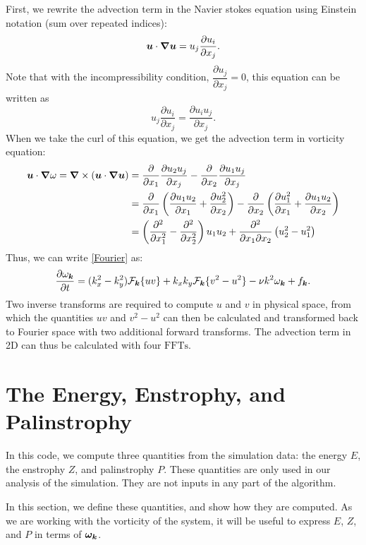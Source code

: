 \documentclass[12pt]{article}
\def\v{\bm}
\def\vw{{\v\w}}
\begin{document}
First, we rewrite the advection term in the Navier stokes equation using Einstein notation (sum over repeated indices):
$$\vu\cdot\grad\vu =u_j\dfrac{\partial u_i}{\partial x_j}.$$
Note that with the incompressibility condition, $\dfrac{\partial u_j}{\partial x_j} =0$, this equation can be written as 
\begin{equation}
u_j\dfrac{\partial u_i}{\partial x_j} = \dfrac{\partial u_iu_j}{\partial x_j}.
\end{equation}
When we take the curl of this equation, we get the advection term in vorticity equation:
\begin{align*}
\vu\cdot\grad\omega =\grad \times \left(\vu\cdot\grad\vu \right)&= \dfrac{\partial }{\partial x_1}\dfrac{\partial u_2u_j}{\partial x_j}  - \dfrac{\partial }{\partial x_2}\dfrac{\partial u_1u_j}{\partial x_j}\\
&= \dfrac{\partial }{\partial x_1}\left(\dfrac{\partial u_1u_2}{\partial x_1}+\dfrac{\partial u_2^2}{\partial x_2}\right)  - \dfrac{\partial }{\partial x_2}\left(\dfrac{\partial u_1^2}{\partial x_1}+\dfrac{\partial u_1u_2}{\partial x_2}\right)\\
&= \left(\frac{\partial^2}{\partial x_1^2} - \frac{\partial^2}{\partial x_2^2}\right)u_1u_2 +\frac{\partial^2}{\partial x_1\partial x_2}\left(u_2^2-u_1^2\right)\\
\end{align*}
Thus, we can write \ref{Fourier} as:
\begin{equation}\label{evolutionary}
  \frac{\partial\omega_{\vk}}{\partial t} =
  (k_x^2-k_y^2) {\cal F}_\vk\{uv\}+k_xk_y{\cal F}_\vk\{v^2-u^2\} -\nu k^2\omega_{\vk} + f_{\vk}.
\end{equation}
Two inverse transforms are required to compute $u$ and $v$ in physical
space, from which the quantities $uv$ and $v^2-u^2$ can then be
calculated and transformed back to Fourier space with two additional
forward transforms. The advection term in 2D can thus be calculated with four $\text{FFTs}$.
\section{The Energy, Enstrophy, and Palinstrophy} 
In this code, we compute three quantities from the simulation data: the energy $E$, the enstrophy $Z$, and palinstrophy $P$.  These quantities are only used in our analysis of the simulation. They are not inputs in any part of the algorithm. 

In this section, we define these quantities, and show how they are  computed. As we are working with the vorticity of the system, it will be useful to express $E$, $Z$, and $P$ in terms of $\vw_\vk$. 
\end{document}
